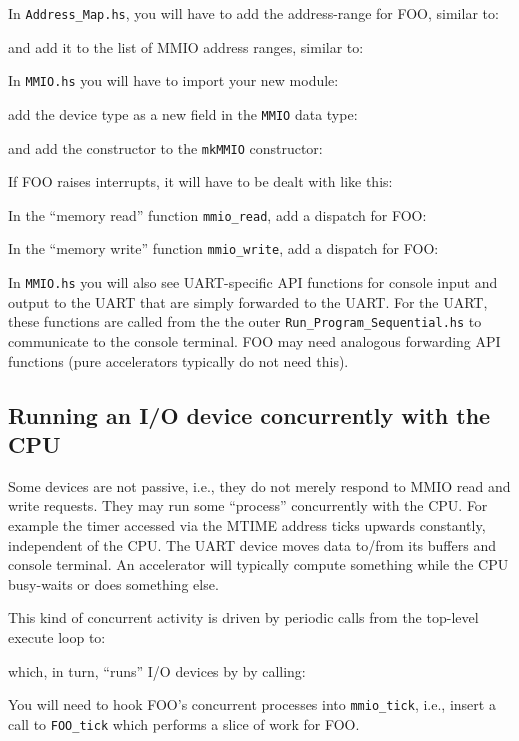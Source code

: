 \documentclass[11pt]{article}
\begin{document}
In \verb|Address_Map.hs|, you will have to add the address-range for
FOO, similar to:



and add it to the list of MMIO address ranges, similar to:



In \verb|MMIO.hs| you will have to import your new module:



add the device type as a new field in the \verb|MMIO| data type:



and add the constructor to the \verb|mkMMIO| constructor:



If FOO raises interrupts, it will have to be dealt with like this:



In the ``memory read'' function \verb|mmio_read|, add a dispatch for FOO:



In the ``memory write'' function \verb|mmio_write|, add a dispatch for FOO:



In \verb|MMIO.hs| you will also see UART-specific API functions for
console input and output to the UART that are simply forwarded to the
UART.  For the UART, these functions are called from the the outer
\verb|Run_Program_Sequential.hs| to communicate to the console
terminal.  FOO may need analogous forwarding API functions (pure
accelerators typically do not need this).


\subsection{Running an I/O device concurrently with the CPU}

Some devices are not passive, i.e., they do not merely respond to MMIO
read and write requests.  They may run some ``process'' concurrently
with the CPU.  For example the timer accessed via the MTIME address
ticks upwards constantly, independent of the CPU.  The UART device
moves data to/from its buffers and console terminal.  An accelerator
will typically compute something while the CPU busy-waits or does
something else.

This kind of concurrent activity is driven by periodic calls from the
top-level execute loop to:



which, in turn, ``runs'' I/O devices by by calling:



You will need to hook FOO's concurrent processes into
\verb|mmio_tick|, i.e., insert a call to \verb|FOO_tick| which
performs a slice of work for FOO.

\end{document}
